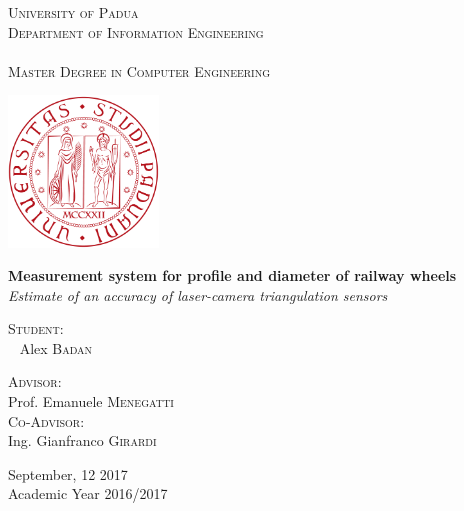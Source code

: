 \begin{center}
  \textsc{
    \huge{University of Padua} \\
    \large{Department of Information Engineering} \\~\\
    \Large{Master Degree in Computer Engineering} \\
  }
  \vspace*{\fill}
  
  \includegraphics[width=0.3\textwidth]{./images/logo_unipd_nomen.png}
  \vspace*{\fill}
  
    \huge{\textbf{Measurement system for profile and diameter of railway wheels}}\\[4mm]
    \Large{\textit{Estimate of an accuracy of laser-camera triangulation sensors}}\\[\baselineskip]
  \vspace*{\fill}

  \begin{minipage}[t]{0.49\textwidth}
    \flushleft
    \textsc{\large{Student:}} \\~ \large{Alex \textsc{Badan}} \\
  \end{minipage}
  \hfill
  \begin{minipage}[t]{0.49\textwidth}
    \flushright
    \textsc{\large{Advisor:}}    \\ \large{Prof. Emanuele \textsc{Menegatti}~~}~ \\
    \textsc{\large{Co-Advisor:}} \\ \large{Ing. Gianfranco \textsc{Girardi}~~}~ \\
  \end{minipage}
  
  \vspace*{\fill}
  \normalsize{September, 12 2017 \\ Academic Year 2016/2017}
\end{center}
